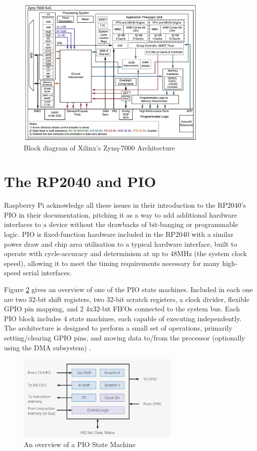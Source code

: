 \begin{figure}[H]
    \centering
    \includegraphics[width=0.85\textwidth]{../img/zynq.png}
    \caption{Block diagram of Xilinx's Zynq-7000 Architecture \citep{zynq}}
    \label{fig:zynq}
\end{figure}


\section{The RP2040 and PIO}
Raspberry Pi acknowledge all these issues in their introduction to the RP2040's PIO in their documentation, pitching it as a way to add additional hardware interfaces to a device without the drawbacks of bit-banging or programmable logic. PIO is fixed-function hardware included in the RP2040 with a similar power draw and chip area utilisation to a typical hardware interface, built to operate with cycle-accuracy and determinism at up to 48MHz (the system clock speed), allowing it to meet the timing requirements necessary for many high-speed serial interfaces.

Figure \ref{fig:pio-sm} gives an overview of one of the PIO state machines. Included in each one are two 32-bit shift registers, two 32-bit scratch registers, a clock divider, flexible GPIO pin mapping, and 2 4x32-bit FIFOs connected to the system bus. Each PIO block includes 4 state machines, each capable of executing independently. The architecture is designed to perform a small set of operations, primarily setting/clearing GPIO pins, and moving data to/from the processor (optionally using the DMA subsystem) \cite{rp2040}.

\begin{figure}[H]
    \centering
    \includegraphics[width=0.7\textwidth]{../img/rp2040-state-machine.png}
    \caption{An overview of a PIO State Machine \citep{rp2040}}
    \label{fig:pio-sm}
\end{figure}

